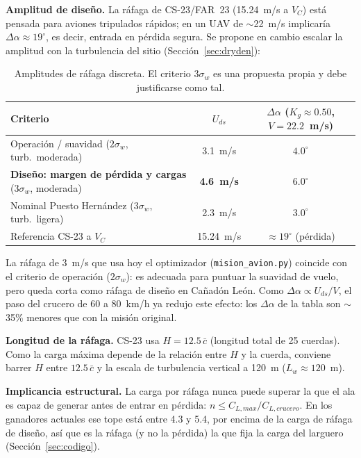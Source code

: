 \documentclass[11pt]{article}
\begin{document}
\textbf{Amplitud de diseño.} La ráfaga de CS-23/FAR~23 (15.24~m/s a $V_C$)
está pensada para aviones tripulados rápidos; en un UAV de $\sim$22~m/s
implicaría $\Delta\alpha\approx19^\circ$, es decir, entrada en pérdida segura.
Se propone en cambio escalar la amplitud con la turbulencia del sitio
(Sección~\ref{sec:dryden}):

\begin{table}[H]
\centering
\small
\begin{tabular}{@{}lcc@{}}
\toprule
Criterio & $U_{ds}$ & $\Delta\alpha$ ($K_g\approx0.50$, $V=22.2$~m/s) \\
\midrule
Operación / suavidad ($2\sigma_w$, turb.\ moderada) & 3.1~m/s & $4.0^\circ$ \\
\textbf{Diseño: margen de pérdida y cargas} ($3\sigma_w$, moderada) & \textbf{4.6~m/s} & $\mathbf{6.0^\circ}$ \\
Nominal Puesto Hernández ($3\sigma_w$, turb.\ ligera) & 2.3~m/s & $3.0^\circ$ \\
Referencia CS-23 a $V_C$ & 15.24~m/s & $\approx19^\circ$ (pérdida) \\
\bottomrule
\end{tabular}
\caption{Amplitudes de ráfaga discreta. El criterio $3\sigma_w$ es una
propuesta propia y debe justificarse como tal.}
\label{tab:rafaga}
\end{table}

La ráfaga de 3~m/s que usa hoy el optimizador (\texttt{mision\_avion.py})
coincide con el criterio de operación ($2\sigma_w$): es adecuada para
puntuar la suavidad de vuelo, pero queda corta como ráfaga de diseño en
Cañadón León. Como $\Delta\alpha\propto U_{ds}/V$, el paso del crucero de
60 a 80~km/h ya redujo este efecto: los $\Delta\alpha$ de la tabla son
$\sim$35\% menores que con la misión original.

\textbf{Longitud de la ráfaga.} CS-23 usa $H=12.5\,\bar c$ (longitud total de
25 cuerdas). Como la carga máxima depende de la relación entre $H$ y la
cuerda, conviene barrer $H$ entre $12.5\,\bar c$ y la escala de turbulencia
vertical a 120~m ($L_w\approx120$~m).

\textbf{Implicancia estructural.} La carga por ráfaga nunca puede superar
la que el ala es capaz de generar antes de entrar en pérdida:
$n\leq C_{L,max}/C_{L,crucero}$. En los ganadores actuales ese tope está
entre 4.3 y 5.4, por encima de la carga de ráfaga de diseño, así que es la
ráfaga (y no la pérdida) la que fija la carga del larguero
(Sección~\ref{sec:codigo}).
\end{document}
